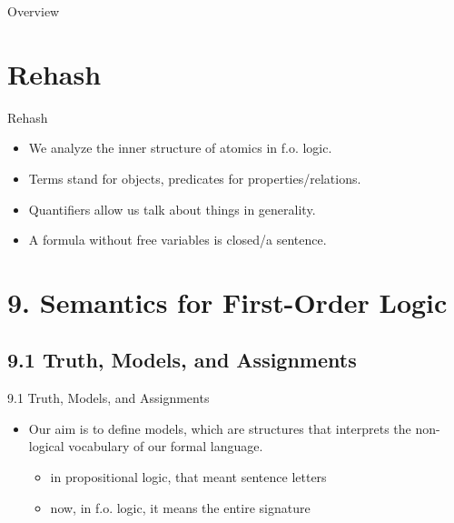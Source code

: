 
\begin{frame}
  \setcounter{framenumber}{257}
  \maketitle
\end{frame}

\begin{frame}{Overview}
\tableofcontents
\end{frame}

\section{Rehash}
\begin{frame}{Rehash}
	
	\begin{itemize}%
	\itemsep=16pt
	
		\item We analyze the inner structure of atomics in f.o. logic.
		
		\item  Terms stand for objects, predicates for properties/relations.
		
		\item Quantifiers allow us talk about things in generality.
		
		\item A formula without free variables is closed/a sentence.
							
	\end{itemize}

\end{frame}
		

\section{9. Semantics for First-Order Logic}
\subsection{9.1 Truth, Models, and Assignments}

\begin{frame}{9.1 Truth, Models, and Assignments}

	\begin{itemize}%
	\itemsep=16pt
		
		\item Our aim is to define models, which are structures that interprets the non-logical vocabulary of our formal language.
		
		\begin{itemize}
			
			\item in propositional logic, that meant sentence letters
			
			\item now, in f.o. logic, it means the entire signature
		
		\end{itemize}
		
	\end{itemize}

\end{frame}

